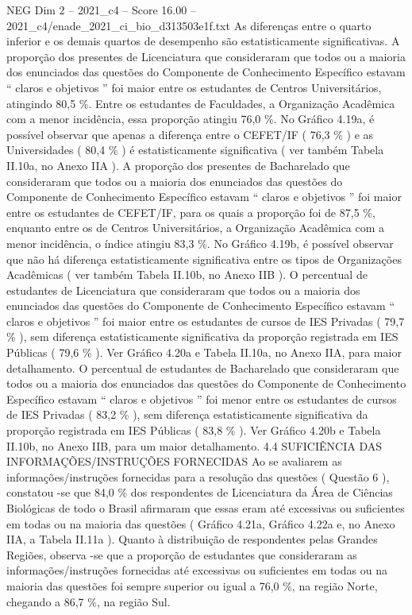\begin{textsample}{NEG Dim 2 – 2021\_c4 – Score 16.00 – 2021\_c4/enade\_2021\_ci\_bio\_d313503e1f.txt}
As diferenças entre o quarto inferior e os demais quartos de desempenho são estatisticamente significativas.
A proporção dos presentes de Licenciatura que consideraram que todos ou a maioria dos enunciados das questões do Componente de Conhecimento Específico estavam “ claros e objetivos ” foi maior entre os estudantes de Centros Universitários, atingindo 80,5 \%.
Entre os estudantes de Faculdades, a Organização Acadêmica com a menor incidência, essa proporção atingiu 76,0 \%.
No Gráfico 4.19a, é possível observar que apenas a diferença entre o CEFET/IF ( 76,3 \% ) e as Universidades ( 80,4 \% ) é estatisticamente significativa ( ver também Tabela II.10a, no Anexo IIA ).
A proporção dos presentes de Bacharelado que consideraram que todos ou a maioria dos enunciados das questões do Componente de Conhecimento Específico estavam “ claros e objetivos ” foi maior entre os estudantes de CEFET/IF, para os quais a proporção foi de 87,5 \%, enquanto entre os de Centros Universitários, a Organização Acadêmica com a menor incidência, o índice atingiu 83,3 \%.
No Gráfico 4.19b, é possível observar que não há diferença estatisticamente significativa entre os tipos de Organizações Acadêmicas ( ver também Tabela II.10b, no Anexo IIB ).
O percentual de estudantes de Licenciatura que consideraram que todos ou a maioria dos enunciados das questões do Componente de Conhecimento Específico estavam “ claros e objetivos ” foi maior entre os estudantes de cursos de IES Privadas ( 79,7 \% ), sem diferença estatisticamente significativa da proporção registrada em IES Públicas ( 79,6 \% ).
Ver Gráfico 4.20a e Tabela II.10a, no Anexo IIA, para maior detalhamento.
O percentual de estudantes de Bacharelado que consideraram que todos ou a maioria dos enunciados das questões do Componente de Conhecimento Específico estavam “ claros e objetivos ” foi menor entre os estudantes de cursos de IES Privadas ( 83,2 \% ), sem diferença estatisticamente significativa da proporção registrada em IES Públicas ( 83,8 \% ).
Ver Gráfico 4.20b e Tabela II.10b, no Anexo IIB, para um maior detalhamento. 4.4 SUFICIÊNCIA DAS INFORMAÇÕES/INSTRUÇÕES FORNECIDAS Ao se avaliarem as informações/instruções fornecidas para a resolução das questões ( Questão 6 ), constatou -se que 84,0 \% dos respondentes de Licenciatura da Área de Ciências Biológicas de todo o Brasil afirmaram que essas eram até excessivas ou suficientes em todas ou na maioria das questões ( Gráfico 4.21a, Gráfico 4.22a e, no Anexo IIA, a Tabela II.11a ).
Quanto à distribuição de respondentes pelas Grandes Regiões, observa -se que a proporção de estudantes que consideraram as informações/instruções fornecidas até excessivas ou suficientes em todas ou na maioria das questões foi sempre superior ou igual a 76,0 \%, na região Norte, chegando a 86,7 \%, na região Sul.

\end{textsample}
